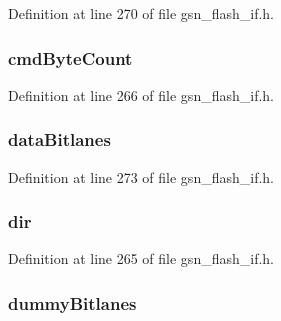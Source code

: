 Definition at line 270 of file gsn\_\-flash\_\-if.h.

\hypertarget{a00080_ad34d27c213b62c55610918476e3d4ea9}{
\subsubsection[{cmdByteCount}]{ {\bf cmdByteCount}}}
\label{a00080_ad34d27c213b62c55610918476e3d4ea9}


Definition at line 266 of file gsn\_\-flash\_\-if.h.

\hypertarget{a00080_a6e4d0162b5d0af605625e4e5ff0bb07f}{
\subsubsection[{dataBitlanes}]{ {\bf dataBitlanes}}}
\label{a00080_a6e4d0162b5d0af605625e4e5ff0bb07f}


Definition at line 273 of file gsn\_\-flash\_\-if.h.

\hypertarget{a00080_ab439248638d21e4206cbcf99b82a1363}{
\subsubsection[{dir}]{ {\bf dir}}}
\label{a00080_ab439248638d21e4206cbcf99b82a1363}


Definition at line 265 of file gsn\_\-flash\_\-if.h.

\hypertarget{a00080_a75caed3fbf287dd4f43892f6af082cb4}{
\subsubsection[{dummyBitlanes}]{ {\bf dummyBitlanes}}}
\label{a00080_a75caed3fbf287dd4f43892f6af082cb4}


